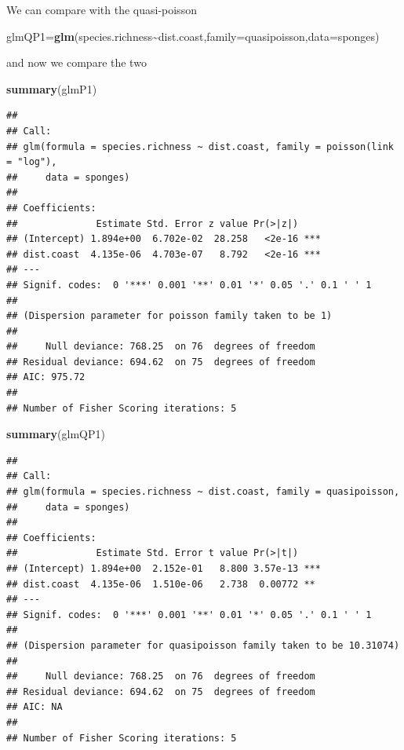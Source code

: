\documentclass[
]{book}
\newenvironment{Shaded}{\begin{snugshade}}{\end{snugshade}}
\newcommand{\AttributeTok}[1]{\textcolor[rgb]{0.13,0.29,0.53}{#1}}
\newcommand{\FunctionTok}[1]{\textcolor[rgb]{0.13,0.29,0.53}{\textbf{#1}}}
\newcommand{\NormalTok}[1]{#1}
\newcommand{\OtherTok}[1]{\textcolor[rgb]{0.56,0.35,0.01}{#1}}
\newcommand{\SpecialCharTok}[1]{\textcolor[rgb]{0.81,0.36,0.00}{\textbf{#1}}}
\begin{document}
We can compare with the quasi-poisson

\begin{Shaded}
\begin{Highlighting}[]
\NormalTok{glmQP1}\OtherTok{=}\FunctionTok{glm}\NormalTok{(species.richness}\SpecialCharTok{\textasciitilde{}}\NormalTok{dist.coast,}\AttributeTok{family=}\NormalTok{quasipoisson,}\AttributeTok{data=}\NormalTok{sponges)}
\end{Highlighting}
\end{Shaded}

and now we compare the two

\begin{Shaded}
\begin{Highlighting}[]
\FunctionTok{summary}\NormalTok{(glmP1)}
\end{Highlighting}
\end{Shaded}

\begin{verbatim}
## 
## Call:
## glm(formula = species.richness ~ dist.coast, family = poisson(link = "log"), 
##     data = sponges)
## 
## Coefficients:
##              Estimate Std. Error z value Pr(>|z|)    
## (Intercept) 1.894e+00  6.702e-02  28.258   <2e-16 ***
## dist.coast  4.135e-06  4.703e-07   8.792   <2e-16 ***
## ---
## Signif. codes:  0 '***' 0.001 '**' 0.01 '*' 0.05 '.' 0.1 ' ' 1
## 
## (Dispersion parameter for poisson family taken to be 1)
## 
##     Null deviance: 768.25  on 76  degrees of freedom
## Residual deviance: 694.62  on 75  degrees of freedom
## AIC: 975.72
## 
## Number of Fisher Scoring iterations: 5
\end{verbatim}

\begin{Shaded}
\begin{Highlighting}[]
\FunctionTok{summary}\NormalTok{(glmQP1)}
\end{Highlighting}
\end{Shaded}

\begin{verbatim}
## 
## Call:
## glm(formula = species.richness ~ dist.coast, family = quasipoisson, 
##     data = sponges)
## 
## Coefficients:
##              Estimate Std. Error t value Pr(>|t|)    
## (Intercept) 1.894e+00  2.152e-01   8.800 3.57e-13 ***
## dist.coast  4.135e-06  1.510e-06   2.738  0.00772 ** 
## ---
## Signif. codes:  0 '***' 0.001 '**' 0.01 '*' 0.05 '.' 0.1 ' ' 1
## 
## (Dispersion parameter for quasipoisson family taken to be 10.31074)
## 
##     Null deviance: 768.25  on 76  degrees of freedom
## Residual deviance: 694.62  on 75  degrees of freedom
## AIC: NA
## 
## Number of Fisher Scoring iterations: 5
\end{verbatim}
\end{document}
